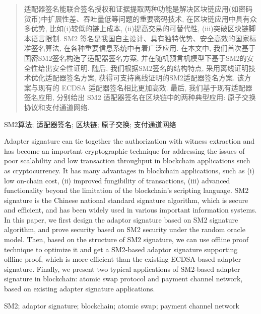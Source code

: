 \documentclass[review]{jcr}
\begin{document}
\begin{frontmatter}


  \begin{abstract}
适配器签名能联合签名授权和证据提取两种功能是解决区块链应用(如密码货币)中扩展性差、吞吐量低等问题的重要密码技术, 在区块链应用中具有众多优势, 比如(i)较低的链上成本, (ii)提高交易的可替代性, (iii)突破区块链脚本语言限制. SM2 签名是我国自主设计、具有独特优势、安全高效的国家标准签名算法, 在各种重要信息系统中有着广泛应用. 在本文中, 我们首次基于国密SM2签名构造了适配器签名方案, 并在随机预言机模型下基于SM2的安全性给出安全性证明. 随后, 我们根据SM2签名的结构特点, 采用离线证明技术优化适配器签名方案, 获得可支持离线证明的SM2适配器签名方案. 该方案与现有的 ECDSA 适配器签名相比更加高效. 最后, 我们基于现有适配器签名应用, 分别给出 SM2 适配器签名在区块链中的两种典型应用: 原子交换协议和支付通道网络.  
  \end{abstract}

  \begin{keywords}
    SM2算法; 适配器签名; 区块链; 原子交换; 支付通道网络
  \end{keywords}

  \begin{eabstract}
   Adapter signature can tie together the authorization with witness extraction and has become an important cryptographic technique for addressing the issues of poor scalability and low transaction throughput in blockchain applications such as cryptocurrency. It has many advantages in blockchain applications, such as (i) low on-chain cost, (ii) improved fungibility of transactions, (iii) advanced functionality beyond the limitation of the blockchain's scripting language. SM2 signature is the Chinese national standard signature algorithm, which is secure and efficient, and has been widely used in various important information systems. In this paper, we first design the adaptor signature based on SM2 signature algorithm, and prove security based on SM2 security under the random oracle model. Then, based on the structure of SM2 signature, we can use offline proof technique to optimize it and get a SM2-based adaptor signature supporting offline proof, which is more efficient than the existing ECDSA-based adapter signature. Finally, we present two typical applications of SM2-based adapter signature in blockchain: atomic swap protocol and payment channel network, based on existing adapter signature applications.

  \end{eabstract}

  \begin{ekeywords}
    SM2; adaptor signature; blockchain; atomic swap; payment channel network
  \end{ekeywords}
\end{frontmatter}
\end{document}
